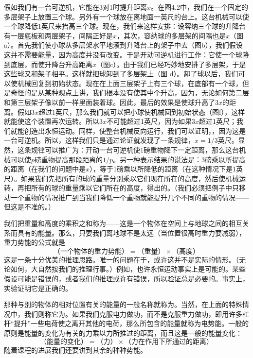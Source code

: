 假如我们有一台可逆机，它能在3对1时提升距离$ x $。在图4.2中，我们在一个固定的多层架子上放置三个球。另外有一个球放在离地面一英尺的台上。这台机械可以使一个球降低1英尺来抬高三个球。现在，我们来这样安排：设容纳三个球的升降台有一层底板和两层架子，间隔正好是$ x $，其次，容纳球的多层架的间隔也是$ x $（图a）。首先我们使小球从多层架水平地滚到升降台上的架子中去（图b），我们假设这并不需要能量，因为高度并没有改变。于是开动可逆机进行工作：它使一个球降到底层，而使升降台升高距离$ x $（图c）。由于我们已经巧妙地安排了多层架，于是这些球又和架子相平。这样就把球卸到了多层架上（图 d）。卸了球以后，我们可以使机械回复到初始状态。现在在上面三层架子上有三个球，在底部有一个球，但是奇怪的是从某种观点上讲，我们根本没有使其中个升高，因为，无论如何第二层和第三层架子像以前一样里面装着球。因此，最后的效果是使球升高了$ 3x$的距离。假如$  3x $超过1英尺，那么我们就可以把小球使机械回到初始状态（图f），这样就能使这个装置再次运转。所以$ 3x $不可能超过1英尺，因为如果$ 3x $超过1英尺；我们就能创造出永恒运动。同样，使整台机械反向运行，我们可以证明，，因为这是一台可逆机。所以，这样我们只是通过论证就发现了一条规律，$x=1/3$英尺。显然，这条规律可以推广为：开动一台可逆机使1磅重物降下一定距离，那么这台机械可以使$p$磅重物提高那段距离的$1/p$。另一种表示结果的说法是：3磅乘以所提高的距离（在我们的问题中是$ x $），等于1磅乘以所降低的距离（在这种情况下是1英尺）。如果我们先把所有的球的重量分别乘以它们现在所在的高度，然后使机械运转，再把所有的球的重量乘以它们所在的高度，得出的。（我们必须把例子中只移动一个重物的情况推广到当我们降低一个重物就能提升几个不同的重物的情况——但这是不准的。）

我们把重量和高度的乘积之和称为——这是一个物体在空间上与地球之间的相互关系而具有的能量。那么，只要我们离地球不是太远（当位置很高时重力要减弱），重力势能的公式就是
\begin{equation}
    \label{Eq:I:4:3}
    \text{（一个物体的重力势能）}=
    \text{（重量）}\times\text{（高度）}
\end{equation}
这是一条十分优美的推理思路。唯一的问题在于，或许这并不是实际的情形。（无论如何，大自然按我们的推理行事。）例如，也许永恒运动事实上是可能的。某些假设可能是错误的，或者我们的推理或许有错误，所以验证总是必要的。事实上，实验证明它是正确的。

那种与别的物体的相对位置有关的能量的一般名称就称为。当然，在上面的特殊情况中，我们则称它为。如果我们克服电力做功，而不是克服重力做功，即用许多杠杆“提升”一些电荷使之离开其他的电荷，那么所包含的能量就称为电势能。一般的原则是能量的变化为有关的力乘以力所推过的距离，而且这是一般的能量变化：
\begin{equation}
    \label{Eq:I:4:4}
    \text{（能量的变化）}=
    \text{（力）}\times\text{（力在作用下所通过的距离）}
\end{equation}
随着课程的进展我们还要讲到其余的种种势能。

